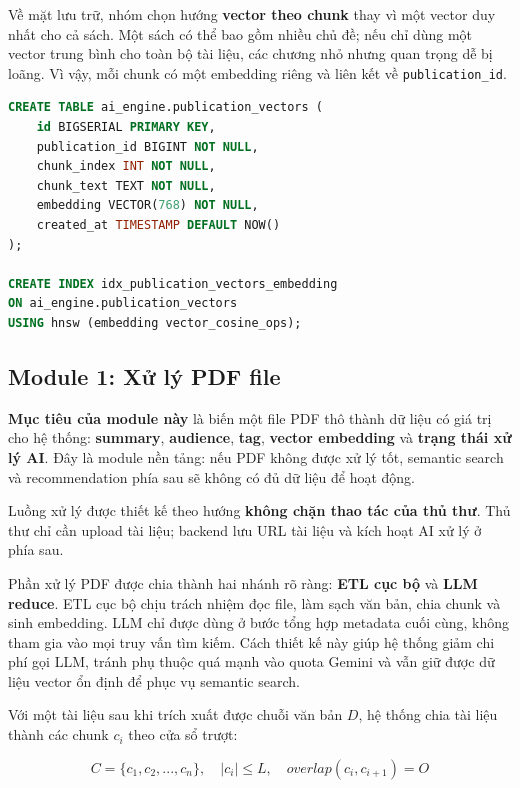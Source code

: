Về mặt lưu trữ, nhóm chọn hướng \textbf{vector theo chunk} thay vì một vector
duy nhất cho cả sách. Một sách có thể bao gồm nhiều chủ đề; nếu chỉ dùng một
vector trung bình cho toàn bộ tài liệu, các chương nhỏ nhưng quan trọng dễ bị
loãng. Vì vậy, mỗi chunk có một embedding riêng và liên kết về
\texttt{publication\_id}.

\begin{lstlisting}[language=SQL, caption={Thiết kế bảng vector phục vụ semantic search}, label={lst:ai_vector_schema_design}]
CREATE TABLE ai_engine.publication_vectors (
    id BIGSERIAL PRIMARY KEY,
    publication_id BIGINT NOT NULL,
    chunk_index INT NOT NULL,
    chunk_text TEXT NOT NULL,
    embedding VECTOR(768) NOT NULL,
    created_at TIMESTAMP DEFAULT NOW()
);

CREATE INDEX idx_publication_vectors_embedding
ON ai_engine.publication_vectors
USING hnsw (embedding vector_cosine_ops);
\end{lstlisting}

\FloatBarrier

\subsection{Module 1: Xử lý PDF file}

\textbf{Mục tiêu của module này} là biến một file PDF thô thành dữ liệu có giá trị cho hệ thống: \textbf{summary}, \textbf{audience}, \textbf{tag}, \textbf{vector embedding} và \textbf{trạng thái xử lý AI}. Đây là module nền tảng: nếu PDF không được xử lý tốt, semantic search và recommendation phía sau sẽ không có đủ dữ liệu để hoạt động.

Luồng xử lý được thiết kế theo hướng \textbf{không chặn thao tác của thủ thư}. Thủ thư chỉ cần upload tài liệu; backend lưu URL tài liệu và kích hoạt AI xử lý ở phía sau.

Phần xử lý PDF được chia thành hai nhánh rõ ràng: \textbf{ETL cục bộ} và
\textbf{LLM reduce}. ETL cục bộ chịu trách nhiệm đọc file, làm sạch văn bản,
chia chunk và sinh embedding. LLM chỉ được dùng ở bước tổng hợp metadata cuối
cùng, không tham gia vào mọi truy vấn tìm kiếm. Cách thiết kế này giúp hệ thống
giảm chi phí gọi LLM, tránh phụ thuộc quá mạnh vào quota Gemini và vẫn giữ được
dữ liệu vector ổn định để phục vụ semantic search.

Với một tài liệu sau khi trích xuất được chuỗi văn bản $D$, hệ thống chia tài
liệu thành các chunk $c_i$ theo cửa sổ trượt:

\[
C = \{c_1, c_2, ..., c_n\}, \quad |c_i| \leq L,\quad overlap(c_i,c_{i+1}) = O
\]

